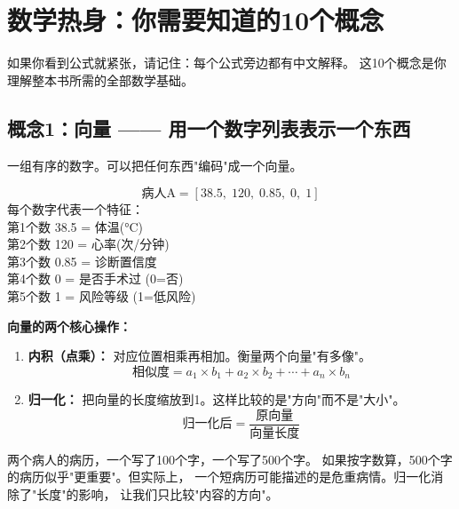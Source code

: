 \documentclass[11pt,a4paper]{ctexart}
\begin{document}
\newpage

\section{数学热身：你需要知道的10个概念}

\begin{warnbox}[别怕]
如果你看到公式就紧张，请记住：每个公式旁边都有中文解释。
这10个概念是你理解整本书所需的全部数学基础。
\end{warnbox}

\subsection{概念1：向量 —— 用一个数字列表表示一个东西}

\begin{defbox}[向量 (Vector)]
一组有序的数字。可以把任何东西"编码"成一个向量。
\end{defbox}

\begin{exambox}[例子：用向量表示一个病人]
$$
\text{病人A} = [38.5,\; 120,\; 0.85,\; 0,\; 1]
$$
每个数字代表一个特征：\\
第1个数 38.5 = 体温(°C)\\
第2个数 120 = 心率(次/分钟)\\
第3个数 0.85 = 诊断置信度\\
第4个数 0 = 是否手术过 (0=否)\\
第5个数 1 = 风险等级 (1=低风险)
\end{exambox}

\textbf{向量的两个核心操作：}

\begin{enumerate}[nosep]
\item \textbf{内积（点乘）：} 对应位置相乘再相加。衡量两个向量"有多像"。
  $$\text{相似度} = a_1 \times b_1 + a_2 \times b_2 + \cdots + a_n \times b_n$$

\item \textbf{归一化：} 把向量的长度缩放到1。这样比较的是"方向"而不是"大小"。
  $$\text{归一化后} = \frac{\text{原向量}}{\text{向量长度}}$$
\end{enumerate}

\begin{keybox}
两个病人的病历，一个写了100个字，一个写了500个字。
如果按字数算，500个字的病历似乎"更重要"。但实际上，
一个短病历可能描述的是危重病情。归一化消除了"长度"的影响，
让我们只比较"内容的方向"。
\end{keybox}
\end{document}
